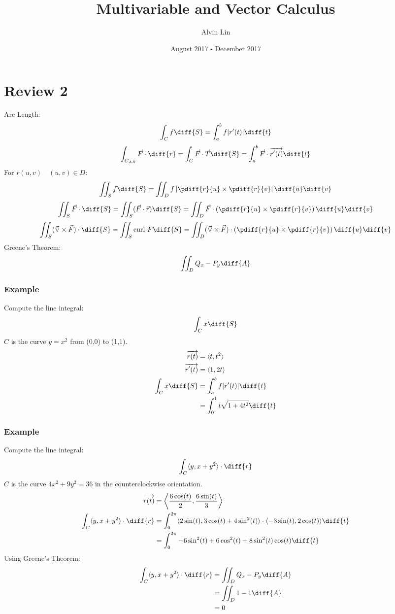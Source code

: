 \documentclass{math}
\title{Multivariable and Vector Calculus}
\author{Alvin Lin}
\date{August 2017 - December 2017}
\begin{document}
\maketitle

\section*{Review 2}
Arc Length:
\[ \int_{C}f\diff{S} = \int_{a}^{b}f|r'(t)|\diff{t} \]
\[ \int_{C_{AB}}\vec{F}\cdot\diff{r} = \int_{C}\vec{F}\cdot\vec{T}\diff{S} =
  \int_{a}^{b}\vec{F}\cdot\overrightarrow{r'(t)}\diff{t} \]
For \( r(u,v) \quad (u,v)\in D \):
\[ \iint_{S}f\diff{S} =
  \iint_{D}f\left|\pdiff{r}{u}\times\pdiff{r}{v}\right|\diff{u}\diff{v} \]
\[ \iint_{S}\vec{F}\cdot\diff{S} = \iint_{S}(\vec{F}\cdot\vec{r})\diff{S} =
  \iint_{D}\vec{F}\cdot\left(\pdiff{r}{u}\times\pdiff{r}{v}\right)
  \diff{u}\diff{v} \]
\[ \iint_{S}(\vec{\triangledown}\times\vec{F})\cdot\diff{S} =
  \iint_{S}\text{curl}~F\diff{S} =
  \iint_{D}(\vec{\triangledown}\times\vec{F})\cdot
  \left(\pdiff{r}{u}\times\pdiff{r}{v}\right)\diff{u}\diff{v} \]
Greene's Theorem:
\[ \iint_{D}Q_x-P_y\diff{A} \]

\subsubsection*{Example}
Compute the line integral:
\[ \int_{C}x\diff{S} \]
\( C \) is the curve \( y = x^2 \) from (0,0) to (1,1).
\begin{align*}
  \overrightarrow{r(t)} &= \langle t,t^2\rangle \\
  \overrightarrow{r'(t)} &= \langle1,2t\rangle \\
  \int_{C}x\diff{S} &= \int_{a}^{b}f|r'(t)|\diff{t} \\
  &= \int_{0}^{1}t\sqrt{1+4t^2}\diff{t}
\end{align*}

\subsubsection*{Example}
Compute the line integral:
\[ \int_{C}\langle y,x+y^2\rangle\cdot\diff{r} \]
\( C \) is the curve \( 4x^2+9y^2 = 36 \) in the counterclockwise orientation.
\begin{align*}
  \overrightarrow{r(t)} &=
    \left\langle\frac{6\cos(t)}{2},\frac{6\sin(t)}{3}\right\rangle \\
  \int_{C}\langle y,x+y^2\rangle\cdot\diff{r} &=
    \int_{0}^{2\pi}\langle2\sin(t),3\cos(t)+4\sin^2(t)\rangle\cdot
    \langle-3\sin(t),2\cos(t)\rangle\diff{t} \\
  &= \int_{0}^{2\pi}-6\sin^2(t)+6\cos^2(t)+8\sin^2(t)\cos(t)\diff{t} \\
\end{align*}
Using Greene's Theorem:
\begin{align*}
  \int_{C}\langle y,x+y^2\rangle\cdot\diff{r} &= \iint_{D}Q_x-P_y\diff{A} \\
  &= \iint_{D}1-1\diff{A} \\
  &= 0
\end{align*}
\end{document}
